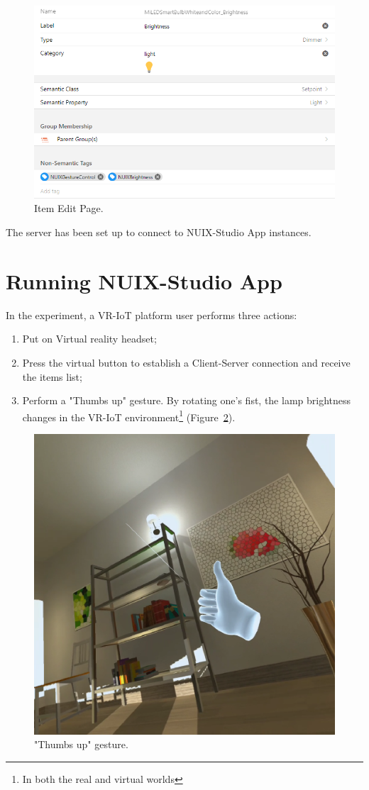 \begin{figure}
  \centering
  \includegraphics[width = 0.9 \linewidth]{figures/ItemEditPage.png}
  \caption{Item Edit Page.}
  \label{fig:ItemEditPage-figure}
\end{figure}

The server has been set up to connect to NUIX-Studio App instances.

\section{Running NUIX-Studio App}

In the experiment, a VR-IoT platform user performs three actions:
\begin{enumerate}
    \item Put on Virtual reality headset;
    \item Press the virtual button to establish a Client-Server connection and receive the items list;
    \item Perform a "Thumbs up" gesture. By rotating one's fist, the lamp brightness changes in the VR-IoT environment\footnote{In both the real and virtual worlds} (Figure~\ref{fig:FullBrightnessOculus-figure}).
\end{enumerate}


\begin{figure}
  \centering
  \includegraphics[width = 0.6 \linewidth]{figures/FullBrightnessOculus.png}
  \caption{"Thumbs up" gesture.}
  \label{fig:FullBrightnessOculus-figure}
\end{figure}


